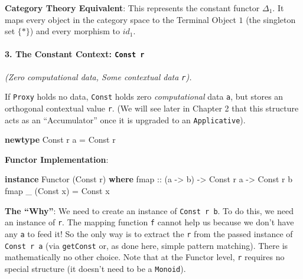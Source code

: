 \documentclass[
]{article}
\newenvironment{Shaded}{}{}
\newcommand{\DataTypeTok}[1]{\textcolor[rgb]{0.56,0.13,0.00}{#1}}
\newcommand{\FunctionTok}[1]{\textcolor[rgb]{0.02,0.16,0.49}{#1}}
\newcommand{\KeywordTok}[1]{\textcolor[rgb]{0.00,0.44,0.13}{\textbf{#1}}}
\newcommand{\NormalTok}[1]{#1}
\newcommand{\OtherTok}[1]{\textcolor[rgb]{0.00,0.44,0.13}{#1}}
\begin{document}
\textbf{Category Theory Equivalent}: This represents the constant
functor \(\Delta_1\). It maps every object in the category space to the
Terminal Object \(1\) (the singleton set \(\{*\}\)) and every morphism
to \(id_1\).

\paragraph{\texorpdfstring{3. The Constant Context:
\texttt{Const\ r}}{3. The Constant Context: Const r}}\label{the-constant-context-const-r}

\emph{(Zero computational data, Some contextual data \texttt{r}).}

If \texttt{Proxy} holds no data, \texttt{Const} holds zero
\emph{computational} data \texttt{a}, but stores an orthogonal
contextual value \texttt{r}. (We will see later in Chapter 2 that this
structure acts as an ``Accumulator'' once it is upgraded to an
\texttt{Applicative}).

\begin{Shaded}
\begin{Highlighting}[]
\KeywordTok{newtype} \DataTypeTok{Const}\NormalTok{ r a }\OtherTok{=} \DataTypeTok{Const}\NormalTok{ r}
\end{Highlighting}
\end{Shaded}

\textbf{Functor Implementation}:

\begin{Shaded}
\begin{Highlighting}[]
\KeywordTok{instance} \DataTypeTok{Functor}\NormalTok{ (}\DataTypeTok{Const}\NormalTok{ r) }\KeywordTok{where}
\OtherTok{    fmap ::}\NormalTok{ (a }\OtherTok{{-}\textgreater{}}\NormalTok{ b) }\OtherTok{{-}\textgreater{}} \DataTypeTok{Const}\NormalTok{ r a }\OtherTok{{-}\textgreater{}} \DataTypeTok{Const}\NormalTok{ r b}
    \FunctionTok{fmap}\NormalTok{ \_ (}\DataTypeTok{Const}\NormalTok{ x) }\OtherTok{=} \DataTypeTok{Const}\NormalTok{ x}
\end{Highlighting}
\end{Shaded}

\textbf{The ``Why''}: We need to create an instance of
\texttt{Const\ r\ b}. To do this, we need an instance of \texttt{r}. The
mapping function \texttt{f} cannot help us because we don't have any
\texttt{a} to feed it! So the only way is to extract the \texttt{r} from
the passed instance of \texttt{Const\ r\ a} (via \texttt{getConst} or,
as done here, simple pattern matching). There is mathematically no other
choice. Note that at the Functor level, \texttt{r} requires no special
structure (it doesn't need to be a \texttt{Monoid}).
\end{document}
